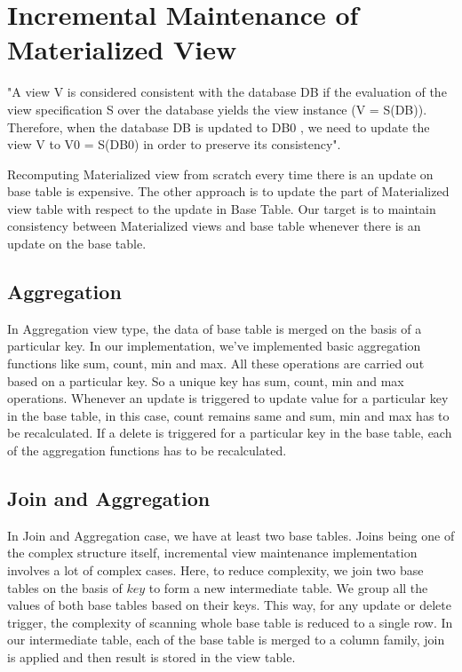 \documentclass[11pt,a4paper,bibtotoc,idxtotoc,headsepline,footsepline,footexclude,BCOR12mm,DIV13]{scrbook}
\begin{document}
\section{Incremental Maintenance of Materialized View}
"A view V is considered consistent with the database DB if the evaluation of the view specification S over the database yields the view instance (V = S(DB)). Therefore, when the database DB is updated to DB0 , we need to update the view V to V0 = S(DB0) in order to preserve its consistency"\cite{incrementalmaintenance:materializedviews}. 

Recomputing Materialized view from scratch every time there is an update on base table is expensive. The other approach is to update the part of Materialized view table with respect to the update in Base Table. Our target is to maintain consistency between Materialized views and base table whenever there is an update on the base table.


\subsection{Aggregation}
In Aggregation view type, the data of base table is merged on the basis of a particular key. In our implementation, we've implemented basic aggregation functions like sum, count, min and max. All these operations are carried out based on a particular key. So a unique key has sum, count, min and max operations. Whenever an update is triggered to update value for a particular key in the base table, in this case, count remains same and sum, min and max has to be recalculated. If a delete is triggered for a particular key in the base table, each of the aggregation functions has to be recalculated. 


\subsection{Join and Aggregation}
In Join and Aggregation case, we have at least two base tables. Joins being one of the complex structure itself, incremental view maintenance implementation involves a lot of complex cases. Here, to reduce complexity, we join two base tables on the basis of $key$ to form a new intermediate table. We group all the values of both base tables based on their keys. This way, for any update or delete trigger, the complexity of scanning whole base table is reduced to a single row. In our intermediate table, each of the base table is merged to a column family, join is applied and then result is stored in the view table. 
\end{document}

